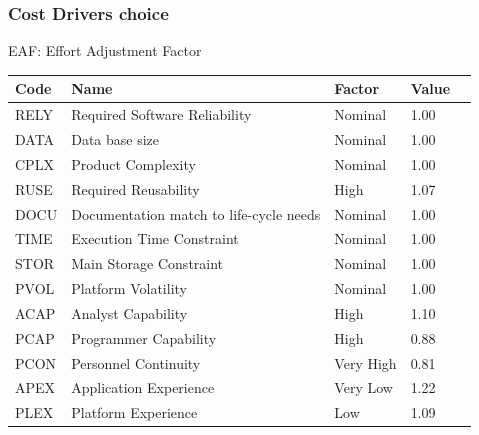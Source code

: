 \documentclass{article}
\begin{document}
		\subsubsection{Cost Drivers choice}
		EAF: Effort Adjustment Factor
		\begin{table}[h!]
			\centering
			\renewcommand{\arraystretch}{1.4}
			\begin{tabular}{| l | l | l | l | l |}
				\hline
				\textbf{Code}  & \textbf{Name}                            & \textbf{Factor}     & \textbf{Value}    \\
				\hline
				RELY           & Required Software Reliability            & Nominal             & 1.00              \\
				\hline
				DATA           & Data base size                           & Nominal             & 1.00              \\
				\hline
				CPLX           & Product Complexity                       & Nominal             & 1.00              \\
				\hline
				RUSE           & Required Reusability                     & High                & 1.07              \\
				\hline
				DOCU           & Documentation match to life-cycle needs  & Nominal             & 1.00              \\
				\hline
				TIME           & Execution Time Constraint                & Nominal             & 1.00              \\
				\hline
				STOR           & Main Storage Constraint                  & Nominal             & 1.00              \\
				\hline
				PVOL           & Platform Volatility                      & Nominal             & 1.00              \\
				\hline
				ACAP           & Analyst Capability                       & High                & 1.10              \\
				\hline
				PCAP           & Programmer Capability                    & High                & 0.88              \\
				\hline
				PCON           & Personnel Continuity                     &                Very High           & 0.81              \\
				\hline
				APEX           & Application Experience                   &                Very Low             & 1.22              \\
				\hline
				PLEX           & Platform Experience                      & Low                 & 1.09              \\

\end{tabular}
\end{table}
\end{document}
